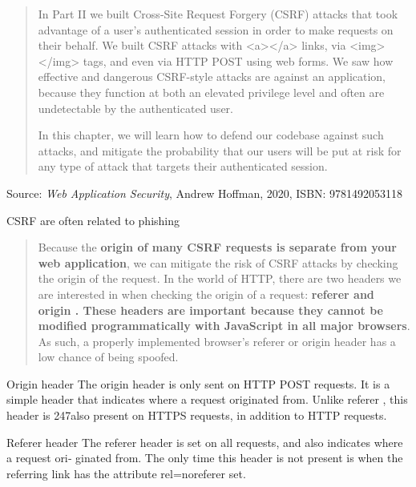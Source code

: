 \documentclass[Screen16to9,17pt]{foils}
\begin{document}





\begin{quote}
In Part II we built Cross-Site Request Forgery (CSRF) attacks that took advantage of a user’s authenticated session in order to make requests on their behalf. We built CSRF
attacks with <a></a> links, via <img></img> tags, and even via HTTP POST using
web forms. We saw how effective and dangerous CSRF-style attacks are against an application, because they function at both an elevated privilege level and often are undetectable by the authenticated user.

In this chapter, we will learn how to defend our codebase against such attacks, and mitigate the probability that our users will be put at risk for any type of attack that targets their authenticated session.
\end{quote}
Source: \emph{Web Application Security}, Andrew Hoffman, 2020, ISBN: 9781492053118

\begin{list2}
\item CSRF are often related to phishing 
\end{list2}




\begin{quote}
Because the {\bf origin of many CSRF requests is separate from your web application}, we can mitigate the risk of CSRF attacks by checking the origin of the request. In the world of HTTP, there are two headers we are interested in when checking the origin of a request: {\bf referer and origin . These headers are important because they cannot be modified programmatically with JavaScript in all major browsers}. As such, a properly implemented browser’s referer or origin header has a low chance of being spoofed.
\end{quote}

\begin{list2}
    \item Origin header
The origin header is only sent on HTTP POST requests. It is a simple header
that indicates where a request originated from. Unlike referer , this header is
247also present on HTTPS requests, in addition to HTTP requests.

\item Referer header
The referer header is set on all requests, and also indicates where a request ori‐
ginated from. The only time this header is not present is when the referring link
has the attribute rel=noreferer set.
\end{list2}
\end{document}
